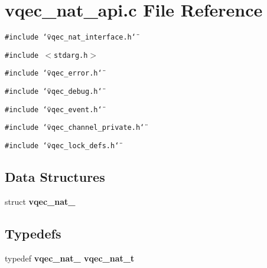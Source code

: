 \section{vqec\_\-nat\_\-api.c File Reference}
\label{vqec__nat__api_8c}
{\tt \#include \char`\"{}vqec\_\-nat\_\-interface.h\char`\"{}}\par
{\tt \#include $<$stdarg.h$>$}\par
{\tt \#include \char`\"{}vqec\_\-error.h\char`\"{}}\par
{\tt \#include \char`\"{}vqec\_\-debug.h\char`\"{}}\par
{\tt \#include \char`\"{}vqec\_\-event.h\char`\"{}}\par
{\tt \#include \char`\"{}vqec\_\-channel\_\-private.h\char`\"{}}\par
{\tt \#include \char`\"{}vqec\_\-lock\_\-defs.h\char`\"{}}\par
\subsection*{Data Structures}
\begin{CompactItemize}
\item 
struct \bf{vqec\_\-nat\_\-}
\end{CompactItemize}
\subsection*{Typedefs}
\begin{CompactItemize}
\item 
typedef \bf{vqec\_\-nat\_\-} \bf{vqec\_\-nat\_\-t}
\end{CompactItemize}
